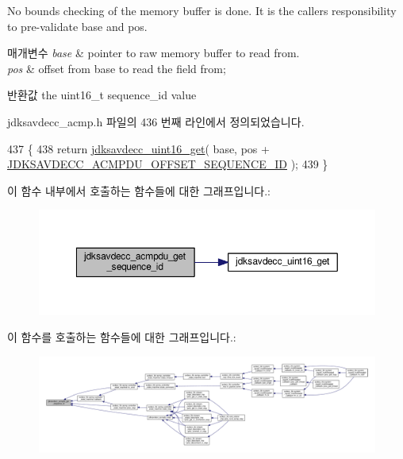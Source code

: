 No bounds checking of the memory buffer is done. It is the caller\textquotesingle{}s responsibility to pre-\/validate base and pos.


\begin{DoxyParams}{매개변수}
{\em base} & pointer to raw memory buffer to read from. \\
\hline
{\em pos} & offset from base to read the field from; \\
\hline
\end{DoxyParams}
\begin{DoxyReturn}{반환값}
the uint16\+\_\+t sequence\+\_\+id value 
\end{DoxyReturn}


jdksavdecc\+\_\+acmp.\+h 파일의 436 번째 라인에서 정의되었습니다.


\begin{DoxyCode}
437 \{
438     \textcolor{keywordflow}{return} \hyperlink{group__endian_ga3fbbbc20be954aa61e039872965b0dc9}{jdksavdecc\_uint16\_get}( base, pos + 
      \hyperlink{group__acmpdu_ga0a473f7f653d82c13465ecf9945a6725}{JDKSAVDECC\_ACMPDU\_OFFSET\_SEQUENCE\_ID} );
439 \}
\end{DoxyCode}


이 함수 내부에서 호출하는 함수들에 대한 그래프입니다.\+:
\nopagebreak
\begin{figure}[H]
\begin{center}
\leavevmode
\includegraphics[width=350pt]{group__acmpdu_gaf20d00ac6431b19d3f1213b4b6bf6fd5_cgraph}
\end{center}
\end{figure}




이 함수를 호출하는 함수들에 대한 그래프입니다.\+:
\nopagebreak
\begin{figure}[H]
\begin{center}
\leavevmode
\includegraphics[width=350pt]{group__acmpdu_gaf20d00ac6431b19d3f1213b4b6bf6fd5_icgraph}
\end{center}
\end{figure}


